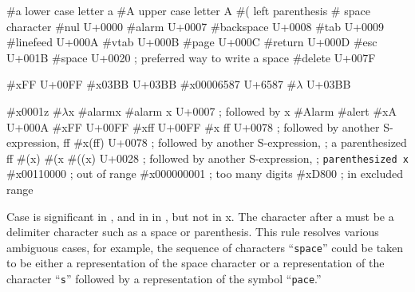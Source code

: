 \begin{schemenoindent}
\#\backwhack{}a          \ev \textrm{lower case letter a}
\#\backwhack{}A          \ev \textrm{upper case letter A}
\#\backwhack{}(          \ev \textrm{left parenthesis}
\#\backwhack{}           \ev \textrm{space character}
\#\backwhack{}nul        \ev \textrm{U+0000}
\#\backwhack{}alarm      \ev \textrm{U+0007}
\#\backwhack{}backspace  \ev \textrm{U+0008}
\#\backwhack{}tab        \ev \textrm{U+0009}
\#\backwhack{}linefeed   \ev \textrm{U+000A}
\#\backwhack{}vtab       \ev \textrm{U+000B}
\#\backwhack{}page       \ev \textrm{U+000C}
\#\backwhack{}return     \ev \textrm{U+000D}
\#\backwhack{}esc        \ev \textrm{U+001B}
\#\backwhack{}space      \ev \textrm{U+0020}
\>\>; \textrm{preferred way to write a space}
\#\backwhack{}delete     \ev \textrm{U+007F}

\#\backwhack{}xFF        \ev \textrm{U+00FF}
\#\backwhack{}x03BB      \ev \textrm{U+03BB}
\#\backwhack{}x00006587  \ev \textrm{U+6587}
\#\backwhack{}\(\lambda\) \ev \textrm{U+03BB}

\#\backwhack{}x0001z     \ev {}
\#\backwhack{}\(\lambda\)x         \ev {}
\#\backwhack{}alarmx     \ev {}
\#\backwhack{}alarm x    \ev \textrm{U+0007}
\>\>; \textrm{followed by {\cf x}}
\#\backwhack{}Alarm      \ev {}
\#\backwhack{}alert      \ev {}
\#\backwhack{}xA         \ev \textrm{U+000A}
\#\backwhack{}xFF        \ev \textrm{U+00FF}
\#\backwhack{}xff        \ev \textrm{U+00FF}
\#\backwhack{}x ff       \ev \textrm{U+0078}
\>\>; \textrm{followed by another S-expression, {\cf ff}}
\#\backwhack{}x(ff)      \ev \textrm{U+0078}
\>\>; \textrm{followed by another S-expression,}
\>\>; \textrm{a parenthesized {\cf ff}}
\#\backwhack{}(x)        \ev {}
\#\backwhack{}(x         \ev {}
\#\backwhack{}((x)       \ev \textrm{U+0028}
\>\>; \textrm{followed by another S-expression,}
\>\>; \texttt{parenthesized {\cf x}}
\#\backwhack{}x00110000  \ev {}
\>\>; \textrm{out of range}
\#\backwhack{}x000000001 \ev {}
\>\>; \textrm{too many digits}  
\#\backwhack{}xD800      \ev {}
\>\>; \textrm{in excluded range}
\end{schemenoindent}

Case is significant in \sharpsign\backwhack{}, and in in
\sharpsign{}, %
but not in \sharpsign\backwhack{}x.  
The character after a 
must be a delimiter character such as a
space or parenthesis.  This rule resolves various ambiguous cases, for
example, the sequence of characters ``{\tt\sharpsign\backwhack space}''
could be taken to be either a representation of the space character or a
representation of the character ``{\tt\sharpsign\backwhack s}'' followed
by a representation of the symbol ``{\tt pace}.''

